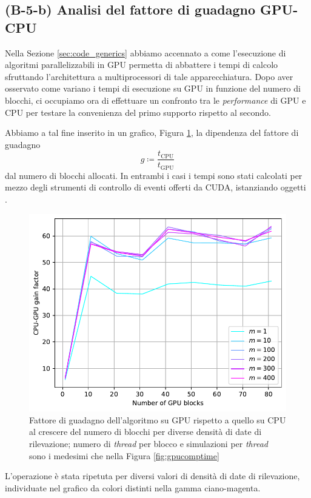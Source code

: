 \subsection{(B-5-b) Analisi del fattore di guadagno GPU-CPU}

Nella Sezione \ref{sec:code_generics} abbiamo accennato a come l'esecuzione di algoritmi parallelizzabili in GPU permetta di abbattere i tempi di calcolo sfruttando l'architettura a multiprocessori di tale apparecchiatura. Dopo aver osservato come variano i tempi di esecuzione su GPU in funzione del numero di blocchi, ci occupiamo ora di effettuare un confronto tra le \textit{performance} di GPU e CPU per testare la convenienza del primo supporto rispetto al secondo.

Abbiamo a tal fine inserito in un grafico, Figura \ref{fig:gainfactor}, la dipendenza del fattore di guadagno
\begin{equation}
     g \coloneqq \frac{t_\text{CPU}}{t_\text{GPU}}
\end{equation}
dal numero di blocchi allocati. In entrambi i casi i tempi sono stati calcolati per mezzo degli strumenti di controllo di eventi offerti da CUDA, istanziando oggetti .

\begin{figure}[t]
    \centering
    \includegraphics[scale=0.5]{graphs/GainFactor_Tesla_GainFactorVsBlocks_VariousM.pdf}
    \caption[Fattore di guadagno al crescere del numero di blocchi per diverse densità di date di rilevazione.]{Fattore di guadagno dell'algoritmo su GPU rispetto a quello su CPU al crescere del numero di blocchi per diverse densità di date di rilevazione; numero di \textit{thread} per blocco e simulazioni per \textit{thread} sono i medesimi che nella Figura \ref{fig:gpucomptime}}
    \label{fig:gainfactor}
\end{figure}
L'operazione è stata ripetuta per diversi valori di densità di date di rilevazione, individuate nel grafico da colori distinti nella gamma ciano-magenta.

